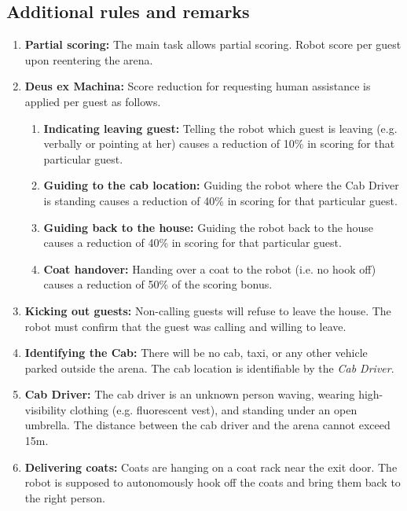 \subsection{Additional rules and remarks}
\begin{enumerate}[nosep]
	\item \textbf{Partial scoring:} The main task allows partial scoring.
	Robot score per guest upon reentering the arena.

	\item \textbf{Deus ex Machina:} Score reduction for requesting human assistance is applied per guest as follows.
	\begin{enumerate}[nosep]
		\item \textbf{Indicating leaving guest:} Telling the robot which guest is leaving (e.g. verbally or pointing at her) causes a reduction of 10\% in scoring for that particular guest.

		\item \textbf{Guiding to the cab location:} Guiding the robot where the Cab Driver is standing causes a reduction of 40\% in scoring for that particular guest.

		\item \textbf{Guiding back to the house:} Guiding the robot back to the house causes a reduction of 40\% in scoring for that particular guest.

		\item \textbf{Coat handover:} Handing over a coat to the robot (i.e. no hook off) causes a reduction of 50\% of the scoring bonus.
	\end{enumerate}

	\item \textbf{Kicking out guests:} Non-calling guests will refuse to leave the house. The robot must confirm that the guest was calling and willing to leave.

	\item \textbf{Identifying the Cab:} There will be no cab, taxi, or any other vehicle parked outside the arena.
	The cab location is identifiable by the \emph{Cab Driver}.

	\item \textbf{Cab Driver:} The cab driver is an unknown person waving, wearing high-visibility clothing (e.g. fluorescent vest), and standing under an open umbrella.
	The distance between the cab driver and the arena cannot exceed 15m.

	\item \textbf{Delivering coats:} Coats are hanging on a coat rack near the exit door.
	The robot is supposed to autonomously hook off the coats and bring them back to the right person.
\end{enumerate}


